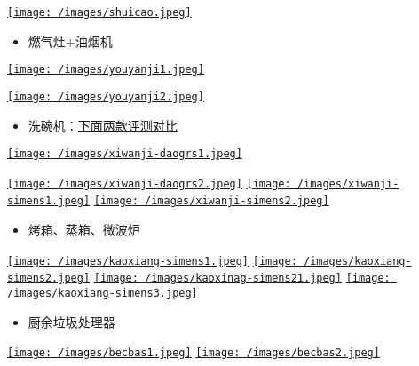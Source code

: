 \documentclass[]{article}
\providecommand{\tightlist}{%
  \setlength{\itemsep}{0pt}\setlength{\parskip}{0pt}}
\begin{document}
\href{https://item.taobao.com/item.htm?spm=a1z0d.6639537.1997196601.151.13307484E7ianp\&id=582513074414}{\texttt{[image: /images/shuicao.jpeg]}}

\begin{itemize}
\tightlist
\item
  燃气灶+油烟机
\end{itemize}

\href{https://item.jd.com/2607373.html\#crumb-wrap}{\texttt{[image: /images/youyanji1.jpeg]}}

\href{https://item.jd.com/100003279296.html}{\texttt{[image: /images/youyanji2.jpeg]}}

\begin{itemize}
\tightlist
\item
  洗碗机：\href{https://post.smzdm.com/p/a25rq6rp/}{下面两款评测对比}
\end{itemize}

\href{https://item.jd.com/100004828676.html}{\texttt{[image: /images/xiwanji-daogrs1.jpeg]}}

\href{https://item.jd.com/11289763170.html}{\texttt{[image: /images/xiwanji-daogrs2.jpeg]}}
\href{https://item.jd.com/7214578.html\#crumb-wrap}{\texttt{[image: /images/xiwanji-simens1.jpeg]}}
\href{https://item.jd.com/7428417.html}{\texttt{[image: /images/xiwanji-simens2.jpeg]}}

\begin{itemize}
\tightlist
\item
  烤箱、蒸箱、微波炉
\end{itemize}

\href{https://item.jd.com/40818575852.html}{\texttt{[image: /images/kaoxiang-simens1.jpeg]}}
\href{https://item.jd.com/40816636872.html}{\texttt{[image: /images/kaoxiang-simens2.jpeg]}}
\href{https://item.jd.com/6771295.html\#crumb-wrap}{\texttt{[image: /images/kaoxinag-simens21.jpeg]}}
\href{https://item.jd.com/6864319.html\#crumb-wrap}{\texttt{[image: /images/kaoxiang-simens3.jpeg]}}

\begin{itemize}
\tightlist
\item
  厨余垃圾处理器
\end{itemize}

\href{https://detail.tmall.com/item.htm?spm=a220m.1000858.1000725.1.7f8c5e99l86tSK\&id=566529221807\&areaId=320100\&user_id=3048822382\&cat_id=2\&is_b=1\&rn=f2b270b27be73f2b5f17631edae39b3a}{\texttt{[image: /images/becbas1.jpeg]}}
\href{https://detail.tmall.com/item.htm?spm=a1z10.3-b-s.w4011-15655300821.32.57ab46ddCA3nd1\&id=584865105801\&rn=7ce2caca976b3a87f4b8734c527aff17\&abbucket=3}{\texttt{[image: /images/becbas2.jpeg]}}
\end{document}

